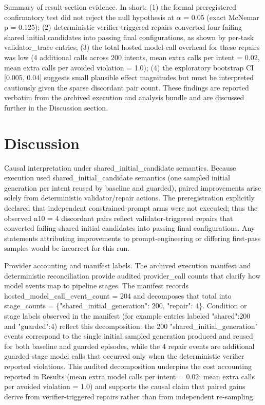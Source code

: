 \documentclass[conference]{IEEEtran}
\begin{document}
Summary of result‑section evidence. In short: (1) the formal preregistered confirmatory test did not reject the null hypothesis at \ensuremath{\alpha} = 0.05 (exact McNemar p = 0.125); (2) deterministic verifier‑triggered repairs converted four failing shared initial candidates into passing final configurations, as shown by per‑task validator\_trace entries; (3) the total hosted model‑call overhead for these repairs was low (4 additional calls across 200 intents, mean extra calls per intent = 0.02, mean extra calls per avoided violation = 1.0); (4) the exploratory bootstrap CI [0.005, 0.04] suggests small plausible effect magnitudes but must be interpreted cautiously given the sparse discordant pair count. These findings are reported verbatim from the archived execution and analysis bundle and are discussed further in the Discussion section.

\section{Discussion}
Causal interpretation under shared\_initial\_candidate semantics. Because execution used shared\_initial\_candidate semantics (one sampled initial generation per intent reused by baseline and guarded), paired improvements arise solely from deterministic validator/repair actions. The preregistration explicitly declared that independent constrained‑prompt arms were not executed; thus the observed n10 = 4 discordant pairs reflect validator‑triggered repairs that converted failing shared initial candidates into passing final configurations. Any statements attributing improvements to prompt‑engineering or differing first‑pass samples would be incorrect for this run.

Provider accounting and manifest labels. The archived execution manifest and deterministic reconciliation provide audited provider\_call counts that clarify how model events map to pipeline stages. The manifest records hosted\_model\_call\_event\_count = 204 and decomposes that total into stage\_counts = \{"shared\_initial\_generation": 200, "repair": 4\}. Condition or stage labels observed in the manifest (for example entries labeled "shared":200 and "guarded":4) reflect this decomposition: the 200 "shared\_initial\_generation" events correspond to the single initial sampled generation produced and reused for both baseline and guarded episodes, while the 4 repair events are additional guarded‑stage model calls that occurred only when the deterministic verifier reported violations. This audited decomposition underpins the cost accounting reported in Results (mean extra model calls per intent = 0.02; mean extra calls per avoided violation = 1.0) and supports the causal claim that paired gains derive from verifier‑triggered repairs rather than from independent re‑sampling.
\end{document}

